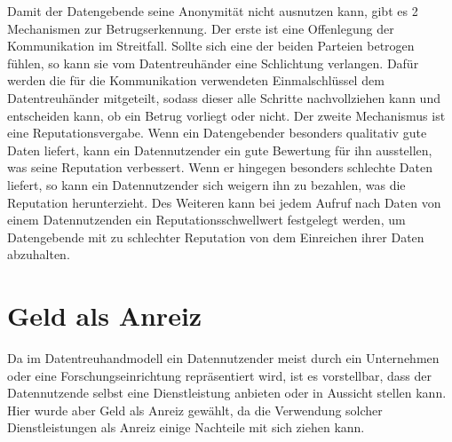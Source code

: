 \documentclass{scrreprt}
\begin{document}
Damit der Datengebende seine Anonymität nicht ausnutzen kann, gibt es 2 Mechanismen zur Betrugserkennung. Der erste ist eine Offenlegung der Kommunikation im Streitfall. Sollte sich eine der beiden Parteien betrogen fühlen, so kann sie vom Datentreuhänder eine Schlichtung verlangen. Dafür werden die für die Kommunikation verwendeten Einmalschlüssel dem Datentreuhänder mitgeteilt, sodass dieser alle Schritte nachvollziehen kann und entscheiden kann, ob ein Betrug vorliegt oder nicht. 
Der zweite Mechanismus ist eine Reputationsvergabe. Wenn ein Datengebender besonders qualitativ gute Daten liefert, kann ein Datennutzender ein gute Bewertung für ihn ausstellen, was seine Reputation verbessert. Wenn er hingegen besonders schlechte Daten liefert, so kann ein Datennutzender sich weigern ihn zu bezahlen, was die Reputation herunterzieht. Des Weiteren kann bei jedem Aufruf nach Daten von einem Datennutzenden ein Reputationsschwellwert festgelegt werden, um Datengebende mit zu schlechter Reputation von dem Einreichen ihrer Daten abzuhalten. 

\section{Geld als Anreiz}
Da im Datentreuhandmodell ein Datennutzender meist durch ein Unternehmen oder eine Forschungseinrichtung repräsentiert wird, ist es vorstellbar, dass der Datennutzende selbst eine Dienstleistung anbieten oder in Aussicht stellen kann. Hier wurde aber Geld als Anreiz gewählt, da die Verwendung solcher Dienstleistungen als Anreiz einige Nachteile mit sich ziehen kann.
\end{document}
